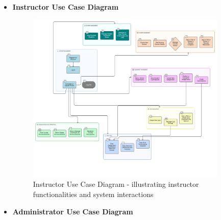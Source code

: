 \documentclass[12pt,a4paper]{article}
\begin{document}
\begin{itemize}
\begin{center}
        \label{fig:student-usecase}
    \end{center}
    \clearpage

    \item \textbf{Instructor Use Case Diagram}
    
    \begin{figure}[!htbp]
        \centering
        \includegraphics[width=0.9\textwidth]{instructor-usecase-diagram.png}
        \caption{Instructor Use Case Diagram - illustrating instructor functionalities and system interactions}
        \label{fig:instructor-usecase}
    \end{figure}
    \FloatBarrier

    \item \textbf{Administrator Use Case Diagram}
    

\end{itemize}
\end{document}
